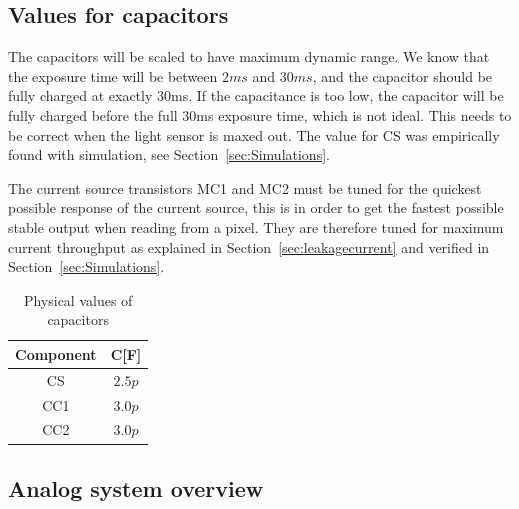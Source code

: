 \subsection{Values for capacitors}

The capacitors will be scaled to have maximum dynamic range. We know that the exposure time  will be between $2ms$ and $30ms$, and the capacitor should be fully charged at exactly 30ms. If the capacitance is too low, the capacitor will be fully charged before the full 30ms exposure time, which is not ideal. This needs to be correct when the light sensor is maxed out. The value for CS was empirically found with simulation, see Section~\ref{sec:Simulations}.

The current source transistors MC1 and MC2 must be tuned for the quickest possible response of the current source, this is in order to get the fastest possible stable output when reading from a pixel.
They are therefore tuned for maximum current throughput as explained in Section~\ref{sec:leakagecurrent} and verified in Section~\ref{sec:Simulations}.

\begin{table}[htbp]
  \centering
  \caption{Physical values of capacitors}
  \begin{tabular}{c | c}
    Component & C[F] \\
    \midrule
    CS & $2.5p$ \\
    CC1 & $3.0p$ \\
    CC2 & $3.0p$
  \end{tabular} \label{tab:capcomponentvalues}
\end{table}

\subsection{Analog system overview}


